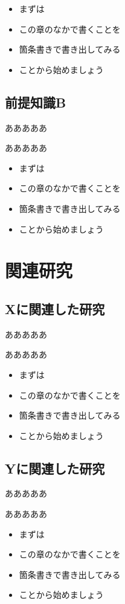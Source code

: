 \documentclass[a4j]{jarticle}
\begin{document}
\begin{itemize}
\item まずは
\item この章のなかで書くことを
\item 箇条書きで書き出してみる
\item ことから始めましょう
\end{itemize}

\subsection{前提知識B}
あああああ

あああああ

\begin{itemize}
\item まずは
\item この章のなかで書くことを
\item 箇条書きで書き出してみる
\item ことから始めましょう
\end{itemize}


\newpage
\section{関連研究} %
\subsection{Xに関連した研究}
あああああ

あああああ

\begin{itemize}
\item まずは
\item この章のなかで書くことを
\item 箇条書きで書き出してみる
\item ことから始めましょう
\end{itemize}

\subsection{Yに関連した研究}
あああああ

あああああ

\begin{itemize}
\item まずは
\item この章のなかで書くことを
\item 箇条書きで書き出してみる
\item ことから始めましょう
\end{itemize}
\end{document}
